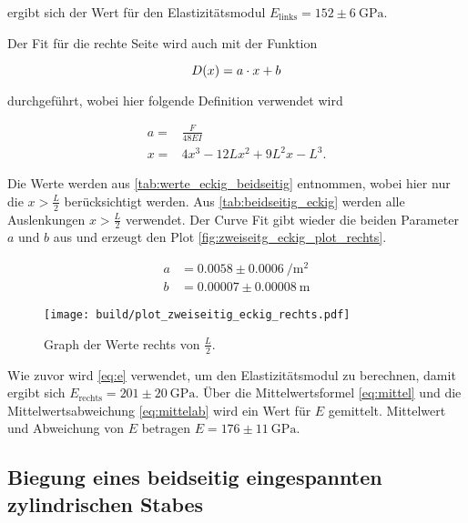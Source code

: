 ergibt sich der Wert für den Elastizitätsmodul $E_\text{links} = 152 \pm \SI{6}{\giga\pascal}$.

Der Fit für die rechte Seite wird auch mit der Funktion

\begin{equation}
    D(x) = a \cdot x + b \\
    \label{eq:durchbiegung_beidseitig2}
\end{equation} 

durchgeführt, wobei hier folgende Definition verwendet wird 

\begin{align}
    a =& \frac{F}{48EI} \\
    x =& 4x^3 - 12Lx^2 + 9L^2x - L^3.
\end{align}

Die Werte werden aus \autoref{tab:werte_eckig_beidseitig} entnommen, wobei hier nur die $x > \frac{L}{2}$ berücksichtigt werden.
Aus \autoref{tab:beidseitig_eckig} werden alle Auslenkungen $x > \frac{L}{2}$ verwendet.
Der Curve Fit gibt wieder die beiden Parameter $a$ und $b$ aus und erzeugt den Plot \autoref{fig:zweiseitg_eckig_plot_rechts}.

\begin{align}
    a &= 0.0058 \pm \SI{0.0006}{\per \meter\squared}\\
    b &= 0.00007 \pm \SI{0.00008}{\meter}
\end{align}

\begin{figure}
    \centering
    \texttt{[image: build/plot\_zweiseitig\_eckig\_rechts.pdf]}
    \caption{Graph der Werte rechts von $\frac{L}{2}$.}
    \label{fig:zweiseitg_eckig_plot_rechts}
\end{figure}

Wie zuvor wird \autoref{eq:e} verwendet, um den Elastizitätsmodul zu berechnen, damit ergibt sich $E_\text{rechts} = 201 \pm \SI{20}{\giga\pascal}$.
Über die Mittelwertsformel \autoref{eq:mittel} und die Mittelwertsabweichung \autoref{eq:mittelab} wird ein Wert für $E$ gemittelt.
Mittelwert und Abweichung von $E$ betragen $E = 176 \pm \SI{11}{\giga\pascal}$.

\subsection{Biegung eines beidseitig eingespannten zylindrischen Stabes}
\label{Biegung eines beidseitig eingespannten zylindrischen Stabes}

